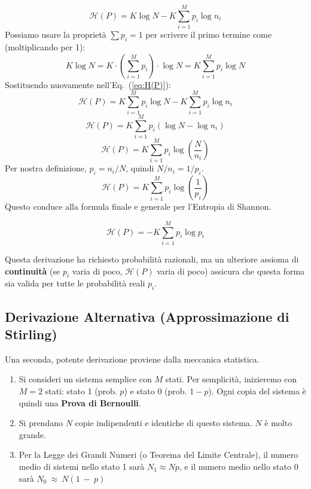 \begin{enumerate}
\begin{equation}\label{eq:H(P)}
    \mathcal{H}(P) = K \log N - K \sum_{i=1}^M p_i \log n_i
\end{equation}
Possiamo usare la proprietà $\sum p_i = 1$ per scrivere il primo termine come (moltiplicando per 1):
\begin{equation}
    K \log N = K \cdot \left(\sum_{i=1}^M p_i\right) \cdot \log N = K \sum_{i=1}^M p_i \log N   
\end{equation}
Sostituendo nuovamente nell'Eq.~(\ref{eq:H(P)}):
\begin{equation}
     \mathcal{H}(P) = K \sum_{i=1}^M p_i \log N - K \sum_{i=1}^M p_i \log n_i 
\end{equation}
\begin{equation}
    \mathcal{H}(P) = K \sum_{i=1}^M p_i (\log N - \log n_i)
\end{equation}
\begin{equation}
    \mathcal{H}(P) = K \sum_{i=1}^M p_i \log \left( \frac{N}{n_i} \right)
\end{equation}
Per nostra definizione, $p_i = n_i / N$, quindi $N/n_i = 1/p_i$.
\begin{equation}
     \mathcal{H}(P) = K \sum_{i=1}^M p_i \log \left( \frac{1}{p_i} \right)
\end{equation} 
Questo conduce alla formula finale e generale per l'Entropia di Shannon.

\begin{tcolorbox}[colback=yellow!25, colframe=yellow!75!orange, coltitle=black, title=\textbf{Entropia di Shannon (Forma Generale)}, label={eq:shannon}]
\begin{equation}
    \mathcal{H}(P) = -K \sum_{i=1}^M p_i \log p_i
    \label{eq:shannon_entropy}
\end{equation}
\end{tcolorbox}
Questa derivazione ha richiesto probabilità razionali, ma un ulteriore assioma di \textbf{continuità} (se $p_i$ varia di poco, $\mathcal{H}(P)$ varia di poco) assicura che questa forma sia valida per tutte le probabilità reali $p_i$.

\subsection{Derivazione Alternativa (Approssimazione di Stirling)}

Una seconda, potente derivazione proviene dalla meccanica statistica.
\begin{enumerate}
    \item Si consideri un sistema semplice con $M$ stati. Per semplicità, inizieremo con $M=2$ stati: stato 1 (prob. $p$) e stato 0 (prob. $1-p$). Ogni copia del sistema è quindi una \textbf{Prova di Bernoulli}.
    \item Si prendano $N$ copie indipendenti e identiche di questo sistema. $N$ è molto grande.
    \item Per la Legge dei Grandi Numeri (o Teorema del Limite Centrale), il numero medio di sistemi nello stato 1 sarà $N_1 \approx Np$, e il numero medio nello stato 0 sarà $N_0~\approx~N(1~-~p)$
    

\end{enumerate}
\end{enumerate}
